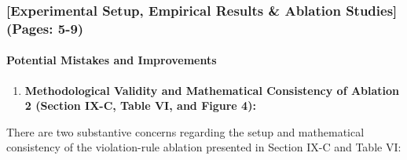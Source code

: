 \documentclass[11pt,a4paper]{article}
\begin{document}
\subsubsection*{[Experimental Setup, Empirical Results \& Ablation Studies] (Pages: 5-9)}
\paragraph{Potential Mistakes and Improvements}
\begin{enumerate}[leftmargin=1.6em,itemsep=3pt]
\item \textbf{Methodological Validity and Mathematical Consistency of Ablation 2 (Section IX-C, Table VI, and Figure 4):}
\end{enumerate}
There are two substantive concerns regarding the setup and mathematical consistency of the violation-rule ablation presented in Section IX-C and Table VI:
\end{document}
